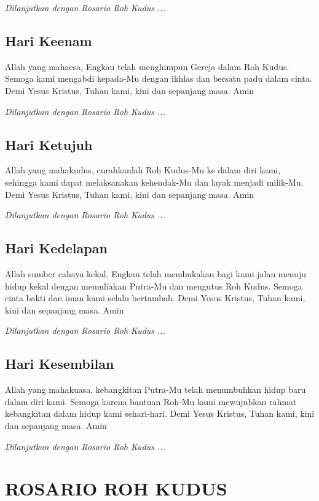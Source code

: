 \documentclass[a5paper,titlepage,11pt]{book}
\begin{document}
    \emph{Dilanjutkan dengan Rosario Roh Kudus ...}
    
\subsection*{Hari Keenam}

    Allah yang mahaesa, Engkau telah menghimpun Gereja dalam Roh Kudus. Semoga kami mengabdi kepada-Mu dengan ikhlas dan bersatu padu dalam cinta. Demi Yesus Kristus, Tuhan kami, kini dan sepanjang masa. Amin
    
    \emph{Dilanjutkan dengan Rosario Roh Kudus ...}

\subsection*{Hari Ketujuh}

    Allah yang mahakudus, curahkanlah Roh Kudus-Mu ke dalam diri kami, sehingga kami dapat melaksanakan kehendak-Mu dan layak menjadi milik-Mu. Demi Yesus Kristus, Tuhan kami, kini dan sepanjang masa. Amin
    
    \emph{Dilanjutkan dengan Rosario Roh Kudus ...}
    
\subsection*{Hari Kedelapan}

    Allah sumber cahaya kekal, Engkau telah membukakan bagi kami jalan menuju hidup kekal dengan memuliakan Putra-Mu dan mengutus Roh Kudus. Semoga cinta bakti dan iman kami selalu bertambah. Demi Yesus Kristus, Tuhan kami, kini dan sepanjang masa. Amin
    
    \emph{Dilanjutkan dengan Rosario Roh Kudus ...}
    
\subsection*{Hari Kesembilan}

    Allah yang mahakuasa, kebangkitan Putra-Mu telah menumbuhkan hidup baru dalam diri kami. Semoga karena bantuan Roh-Mu kami mewujubkan rahmat kebangkitan dalam hidup kami sehari-hari. Demi Yesus Kristus, Tuhan kami, kini dan sepanjang masa. Amin
    
    \emph{Dilanjutkan dengan Rosario Roh Kudus ...}
    
\section{ROSARIO ROH KUDUS}
\end{document}
